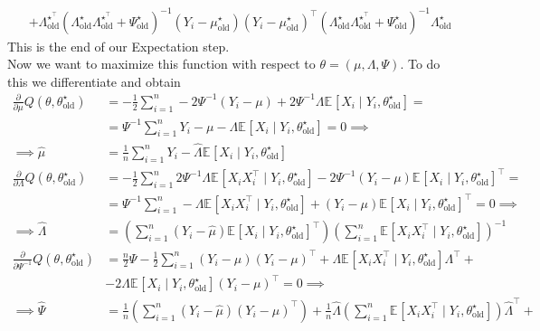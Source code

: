 \documentclass[10pt,notitlepage]{article}
\newcommand{\mean}[2][]{\mathbb{E}_{#1}\left[#2\right]}
\begin{document}
\begin{exercise}[Solution]
\begin{align*}
            &+\Lambda^{\star^\top}_{\text{old}}\left(\Lambda^\star_{\text{old}}\Lambda^{\star^\top}_{\text{old}}+\Psi^\star_{\text{old}}\right)^{-1}\left(Y_i-\mu^\star_{\text{old}}\right) \left(Y_i-\mu^\star_{\text{old}}\right)^\top \left(\Lambda^\star_{\text{old}}\Lambda^{\star^\top}_{\text{old}}+\Psi^\star_{\text{old}}\right)^{-1}\Lambda^{\star}_{\text{old}}
        \end{align*}
        This is the end of our Expectation step. \\
        Now we want to maximize this function with respect to $\theta = \left(\mu,\Lambda,\Psi\right)$. To do this we differentiate and obtain
        \begin{align*}
            \frac{\partial}{\partial\mu}Q\left(\theta, \theta^\star_{\text{old}}\right) &= -\frac{1}{2}\sum_{i=1}^{n} -2\Psi^{-1}\left(Y_i-\mu\right) + 2\Psi^{-1}\Lambda\mean{X_i\mid Y_i, \theta^\star_{\text{old}}} = \\
            &=\Psi^{-1}\sum_{i=1}^{n}Y_i-\mu-\Lambda\mean{X_i\mid Y_i, \theta^\star_{\text{old}}} =0\implies \\
            \implies\hat{\mu} &= \frac{1}{n}\sum_{i=1}^{n} Y_i-\hat{\Lambda}\mean{X_i\mid Y_i, \theta^\star_{\text{old}}}\\
            \frac{\partial}{\partial\Lambda}Q\left(\theta, \theta^\star_{\text{old}}\right) &= -\frac{1}{2}\sum_{i=1}^{n}2\Psi^{-1}\Lambda\mean{X_i X_i^\top\mid Y_i, \theta^\star_{\text{old}}}-2\Psi^{-1}\left(Y_i-\mu\right)\mean{X_i\mid Y_i, \theta^\star_{\text{old}}}^\top = \\
            &= \Psi^{-1}\sum_{i=1}^{n}-\Lambda\mean{X_i X_i^\top\mid Y_i, \theta^\star_{\text{old}}}+\left(Y_i-\mu\right)\mean{X_i\mid Y_i, \theta^\star_{\text{old}}}^\top = 0\implies\\
            \implies\hat{\Lambda}&=\left(\sum_{i=1}^{n}\left(Y_i-\hat{\mu}\right)\mean{X_i\mid Y_i, \theta^\star_{\text{old}}}^\top\right)\left(\sum_{i=1}^{n}\mean{X_i X_i^\top\mid Y_i, \theta^\star_{\text{old}}}\right)^{-1}\\
            \frac{\partial}{\partial\Psi^{-1}}Q\left(\theta, \theta^\star_{\text{old}}\right) &= \frac{n}{2}\Psi-\frac{1}{2}\sum_{i=1}^{n}\left(Y_i-\mu\right)\left(Y_i-\mu\right)^\top + \Lambda\mean{ X_i X_i^\top \mid Y_i, \theta^\star_{\text{old}}}\Lambda^\top +\\
            &- 2 \Lambda \mean{X_i\mid Y_i, \theta^\star_{\text{old}}}\left(Y_i-\mu\right)^\top = 0 \implies\\
            \implies \hat{\Psi} &= \frac{1}{n}\left(\sum_{i=1}^{n}\left(Y_i-\hat{\mu}\right)\left(Y_i-\hat{\mu}\right)^\top\right) + \frac{1}{n}\hat{\Lambda}\left(\sum_{i=1}^{n}\mean{ X_i X_i^\top \mid Y_i, \theta^\star_{\text{old}}}\right)\hat{\Lambda}^\top +\\

\end{align*}
\end{exercise}
\end{document}
